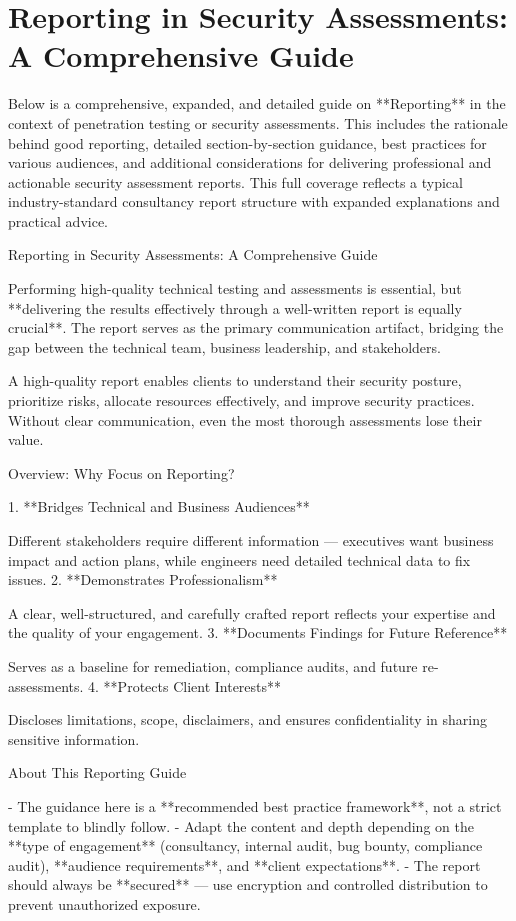 \chapter{Reporting in Security Assessments: A Comprehensive Guide}

Below is a comprehensive, expanded, and detailed guide on **Reporting** in the context of penetration testing or security assessments. This includes the rationale behind good reporting, detailed section-by-section guidance, best practices for various audiences, and additional considerations for delivering professional and actionable security assessment reports. This full coverage reflects a typical industry-standard consultancy report structure with expanded explanations and practical advice.


Reporting in Security Assessments: A Comprehensive Guide

Performing high-quality technical testing and assessments is essential, but **delivering the results effectively through a well-written report is equally crucial**. The report serves as the primary communication artifact, bridging the gap between the technical team, business leadership, and stakeholders.

A high-quality report enables clients to understand their security posture, prioritize risks, allocate resources effectively, and improve security practices. Without clear communication, even the most thorough assessments lose their value.


Overview: Why Focus on Reporting?

1. **Bridges Technical and Business Audiences**  

Different stakeholders require different information — executives want business impact and action plans, while engineers need detailed technical data to fix issues.
2. **Demonstrates Professionalism**  

A clear, well-structured, and carefully crafted report reflects your expertise and the quality of your engagement.
3. **Documents Findings for Future Reference**  

Serves as a baseline for remediation, compliance audits, and future re-assessments.
4. **Protects Client Interests**  

Discloses limitations, scope, disclaimers, and ensures confidentiality in sharing sensitive information.


About This Reporting Guide

- The guidance here is a **recommended best practice framework**, not a strict template to blindly follow.
- Adapt the content and depth depending on the **type of engagement** (consultancy, internal audit, bug bounty, compliance audit), **audience requirements**, and **client expectations**.
- The report should always be **secured** — use encryption and controlled distribution to prevent unauthorized exposure.



